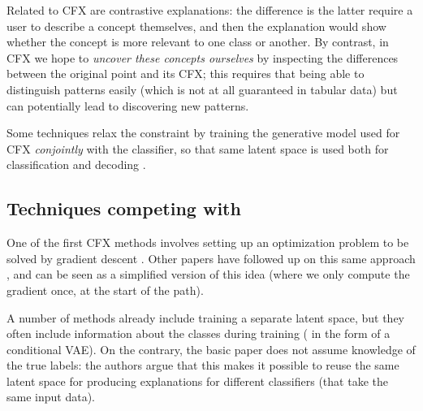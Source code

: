 \documentclass[../main.tex]{subfiles}
\begin{document}
Related to CFX are contrastive explanations: the difference is the latter require a user to describe a concept themselves, and then the explanation would show whether the concept is more relevant to one class or another.
By contrast, in CFX we hope to \emph{uncover these concepts ourselves} by inspecting the differences between the original point and its CFX; this requires that being able to distinguish patterns easily (which is not at all guaranteed in tabular data) but can potentially lead to discovering new patterns.

Some techniques relax the \adhoc{} constraint by training the generative model used for CFX \emph{conjointly} with the classifier, so that same latent space is used both for classification and decoding \cite{zhangInterpretable2022}.

\subsection{Techniques competing with \ls{}}

One of the first CFX methods involves setting up an optimization problem to be solved by gradient descent \cite{wachterCounterfactual2017}.
Other papers have followed up on this same approach \cite{joshiRealistic2019}, and \ls{} can be seen as a simplified version of this idea (where we only compute the gradient once, at the start of the path).

A number of methods already include training a separate latent space, but they often include information about the classes during training (\eg{} in the form of a conditional VAE).
On the contrary, the basic \ls{} paper does not assume knowledge of the true labels: the authors argue that this makes it possible to reuse the same latent space for producing explanations for different classifiers (that take the same input data).


\end{document}
